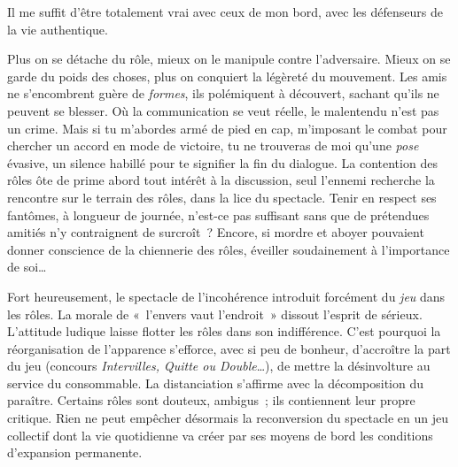 \documentclass[french,twoside]{book} %
\begin{document}
\noindent Il me suffit d’être totalement vrai avec ceux de mon bord, avec les défenseurs de la vie authentique.\par
Plus on se détache du rôle, mieux on le manipule contre l’adversaire. Mieux on se garde du poids des choses, plus on conquiert la légèreté du mouvement. Les amis ne s’encombrent guère de \emph{formes}, ils polémiquent à découvert, sachant qu’ils ne peuvent se blesser. Où la communication se veut réelle, le malentendu n’est pas un crime. Mais si tu m’abordes armé de pied en cap, m’imposant le combat pour chercher un accord en mode de victoire, tu ne trouveras de moi qu’une \emph{pose} évasive, un silence habillé pour te signifier la fin du dialogue. La contention des rôles ôte de prime abord tout intérêt à la discussion, seul l’ennemi recherche la rencontre sur le terrain des rôles, dans la lice du spectacle. Tenir en respect ses fantômes, à longueur de journée, n’est-ce pas suffisant sans que de prétendues amitiés n’y contraignent de surcroît ? Encore, si mordre et aboyer pouvaient donner conscience de la chiennerie des rôles, éveiller soudainement à l’importance de soi…\par
Fort heureusement, le spectacle de l’incohérence introduit forcément du \emph{jeu} dans les rôles. La morale de « l’envers vaut l’endroit » dissout l’esprit de sérieux. L’attitude ludique laisse flotter les rôles dans son indifférence. C’est pourquoi la réorganisation de l’apparence s’efforce, avec si peu de bonheur, d’accroître la part du jeu (concours \emph{Intervilles, Quitte ou Double}…), de mettre la désinvolture au service du consommable. La distanciation s’affirme avec la décomposition du paraître. Certains rôles sont douteux, ambigus ; ils contiennent leur propre critique. Rien ne peut empêcher désormais la reconversion du spectacle en un jeu collectif dont la vie quotidienne va créer par ses moyens de bord les conditions d’expansion permanente.
\end{document}
